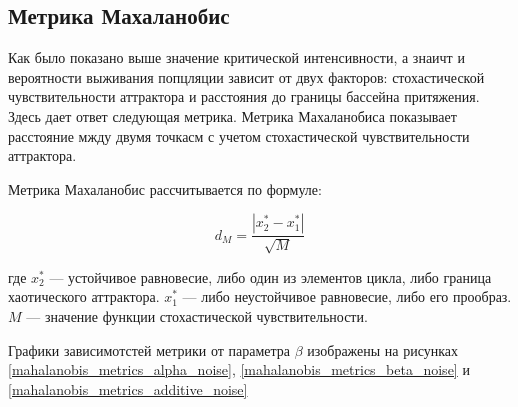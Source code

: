 \subsection{Метрика Махаланобис}

    Как было показано выше значение критической интенсивности, а знаичт и вероятности выживания попцляции зависит от двух факторов: стохастической чувствительности аттрактора и расстояния до границы бассейна притяжения. Здесь дает ответ следующая метрика. Метрика Махаланобиса показывает расстояние мжду двумя точкасм с учетом стохастической чувствительности аттрактора.

    Метрика Махаланобис рассчитывается по формуле:

    \[d_M = \frac{|x_2^* - x_1^*|}{\sqrt{M}}\]
        
    где \(x_2^*\) --- устойчивое равновесие, либо один из элементов цикла, либо граница хаотического аттрактора. \(x_1^*\) --- либо неустойчивое равновесие, либо его прообраз. \(M\) --- значение функции стохастической чувствительности.

    Графики зависимотстей метрики от параметра \(\beta\) изображены на рисунках \ref{mahalanobis_metrics_alpha_noise}, \ref{mahalanobis_metrics_beta_noise} и \ref{mahalanobis_metrics_additive_noise}



